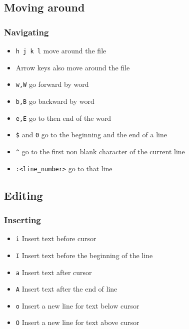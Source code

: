 \documentclass{beamer}
\begin{document}

\subsection{Moving around}

\begin{frame}
\frametitle{Navigating}
\begin{itemize}
\item \texttt{h j k l} move around the file
\item Arrow keys also move around the file
\item \texttt{w,W} go forward by word
\item \texttt{b,B} go backward by word
\item \texttt{e,E} go to then end of the word
\item \texttt{\$} and \texttt{0} go to the beginning and the end of a line
\item \texttt{\^} go to the first non blank character of the current line
\item \texttt{:<line\_number>} go to that line
\end{itemize}

\end{frame}


\subsection{Editing}

\begin{frame}
\frametitle{Inserting}
\begin{itemize}
\item \texttt{i} Insert text before cursor
\item \texttt{I} Insert text before the beginning of the line
\item \texttt{a} Insert text after cursor
\item \texttt{A} Insert text after the end of line
\item \texttt{o} Insert a new line for text below cursor
\item \texttt{O} Insert a new line for text above cursor
\end{itemize}

\end{frame}

\end{document}
